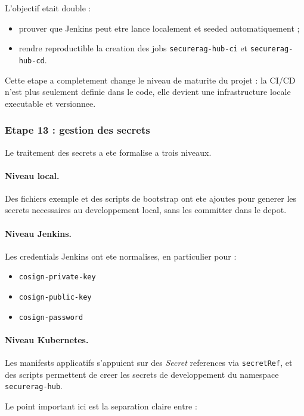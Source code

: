 L'objectif etait double :

\begin{itemize}
  \item prouver que Jenkins peut etre lance localement et seeded automatiquement ;
  \item rendre reproductible la creation des jobs \texttt{securerag-hub-ci} et \texttt{securerag-hub-cd}.
\end{itemize}

Cette etape a completement change le niveau de maturite du projet : la CI/CD n'est plus seulement definie dans le code, elle devient une infrastructure locale executable et versionnee.

\subsubsection{Etape 13 : gestion des secrets}

Le traitement des secrets a ete formalise a trois niveaux.

\paragraph{Niveau local.}
Des fichiers exemple et des scripts de bootstrap ont ete ajoutes pour generer les secrets necessaires au developpement local, sans les committer dans le depot.

\paragraph{Niveau Jenkins.}
Les credentials Jenkins ont ete normalises, en particulier pour :

\begin{itemize}
  \item \texttt{cosign-private-key}
  \item \texttt{cosign-public-key}
  \item \texttt{cosign-password}
\end{itemize}

\paragraph{Niveau Kubernetes.}
Les manifests applicatifs s'appuient sur des \textit{Secret} references via \texttt{secretRef}, et des scripts permettent de creer les secrets de developpement du namespace \texttt{securerag-hub}.

Le point important ici est la separation claire entre :

